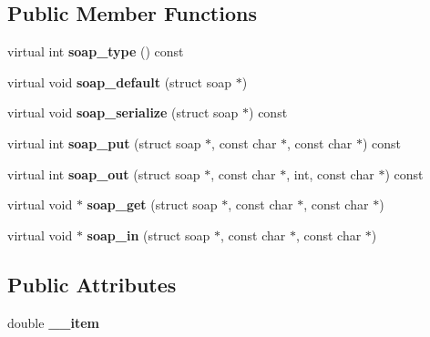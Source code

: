 \subsection*{Public Member Functions}
\begin{DoxyCompactItemize}
\item 
\hypertarget{classxsd____double_a46ae620e798391f2e37692c87887cc66}{
virtual int {\bfseries soap\_\-type} () const }
\label{classxsd____double_a46ae620e798391f2e37692c87887cc66}

\item 
\hypertarget{classxsd____double_a4165750437d3c78c22b87b6beb273c71}{
virtual void {\bfseries soap\_\-default} (struct soap $\ast$)}
\label{classxsd____double_a4165750437d3c78c22b87b6beb273c71}

\item 
\hypertarget{classxsd____double_a6d9fde91b606f1204c4f8a29b6da6758}{
virtual void {\bfseries soap\_\-serialize} (struct soap $\ast$) const }
\label{classxsd____double_a6d9fde91b606f1204c4f8a29b6da6758}

\item 
\hypertarget{classxsd____double_a39f0c678a2c23d0d73255c9715f9e326}{
virtual int {\bfseries soap\_\-put} (struct soap $\ast$, const char $\ast$, const char $\ast$) const }
\label{classxsd____double_a39f0c678a2c23d0d73255c9715f9e326}

\item 
\hypertarget{classxsd____double_a629e225ab9719458babbccb68604fee6}{
virtual int {\bfseries soap\_\-out} (struct soap $\ast$, const char $\ast$, int, const char $\ast$) const }
\label{classxsd____double_a629e225ab9719458babbccb68604fee6}

\item 
\hypertarget{classxsd____double_aefee46406fdf04e7a9df5548081790a3}{
virtual void $\ast$ {\bfseries soap\_\-get} (struct soap $\ast$, const char $\ast$, const char $\ast$)}
\label{classxsd____double_aefee46406fdf04e7a9df5548081790a3}

\item 
\hypertarget{classxsd____double_a35883999a10c55864de43785a88ba180}{
virtual void $\ast$ {\bfseries soap\_\-in} (struct soap $\ast$, const char $\ast$, const char $\ast$)}
\label{classxsd____double_a35883999a10c55864de43785a88ba180}

\end{DoxyCompactItemize}
\subsection*{Public Attributes}
\begin{DoxyCompactItemize}
\item 
\hypertarget{classxsd____double_a89b9f4270bff4cdb8e82ed457ea9a62b}{
double {\bfseries \_\-\_\-item}}
\label{classxsd____double_a89b9f4270bff4cdb8e82ed457ea9a62b}

\end{DoxyCompactItemize}



